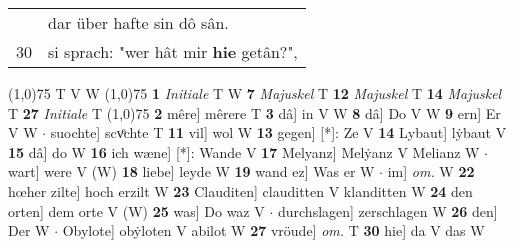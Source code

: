 \documentclass[8pt,a4paper,notitlepage]{article}
\begin{document}
\begin{table}[ht]
\begin{minipage}[t]{0.5\linewidth}
\begin{tabular}{rl}
 & dar über hafte sin dô sân.\\ 
30 & si sprach: "wer hât mir \textbf{hie} getân?",\\ 
\end{tabular}
\scriptsize
\line(1,0){75} \newline
T V W \newline
\line(1,0){75} \newline
\textbf{1} \textit{Initiale} T W  \textbf{7} \textit{Majuskel} T  \textbf{12} \textit{Majuskel} T  \textbf{14} \textit{Majuskel} T  \textbf{27} \textit{Initiale} T  \newline
\line(1,0){75} \newline
\textbf{2} mêre] mêrere T \textbf{3} dâ] in V W \textbf{8} dâ] Do V W \textbf{9} ern] Er V W  $\cdot$ suochte] scvͦchte T \textbf{11} vil] wol W \textbf{13} gegen] [*]: Ze V \textbf{14} Lybaut] lẏbaut V \textbf{15} dâ] do W \textbf{16} ich wæne] [*]: Wande V \textbf{17} Melyanz] Melẏanz V Melianz W  $\cdot$ wart] were V (W) \textbf{18} liebe] leyde W \textbf{19} wand ez] Was er W  $\cdot$ im] \textit{om.} W \textbf{22} hœher zilte] hoch erzilt W \textbf{23} Clauditen] clauditten V klanditten W \textbf{24} den orten] dem orte V (W) \textbf{25} was] Do waz V  $\cdot$ durchslagen] zerschlagen W \textbf{26} den] Der W  $\cdot$ Obylote] obẏloten V abilot W \textbf{27} vröude] \textit{om.} T \textbf{30} hie] da V das W \newline
\end{minipage}
\end{table}
\end{document}
